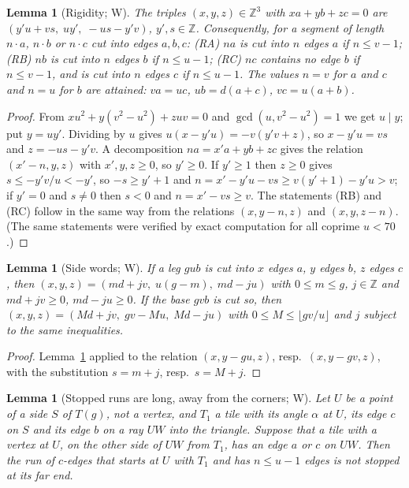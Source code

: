 \documentclass[11pt,reqno]{amsart}
\theoremstyle{plain}
\newtheorem{lemma}[theorem]{Lemma}
\theoremstyle{definition}
\newcommand{\Z}{\mathbb{Z}}
\newcommand{\sW}{\textup{\textsf{W}}}
\begin{document}
\begin{lemma}[Rigidity; \sW]\label{lem:rigid}
The triples $(x,y,z)\in\Z^3$ with $xa+yb+zc=0$ are $(y'u+vs,\;uy',\;-us-y'v)$, $y',s\in\Z$. Consequently, for a segment of
length $n\cdot a$, $n\cdot b$ or $n\cdot c$ cut into edges $a,b,c$: \textup{(RA)} $na$ is cut into $n$ edges $a$ if $n\le v-1$;
\textup{(RB)} $nb$ is cut into $n$ edges $b$ if $n\le u-1$; \textup{(RC)} $nc$ contains no edge $b$ if $n\le v-1$, and is cut into
$n$ edges $c$ if $n\le u-1$. The values $n=v$ for $a$ and $c$ and $n=u$ for $b$ are attained: $va=uc$, $ub=d(a+c)$, $vc=u(a+b)$.
\end{lemma}
\begin{proof}
From $xu^2+y(v^2-u^2)+zuv=0$ and $\gcd(u,v^2-u^2)=1$ we get $u\mid y$; put $y=uy'$. Dividing by $u$ gives
$u(x-y'u)=-v(y'v+z)$, so $x-y'u=vs$ and $z=-us-y'v$. A decomposition $na=x'a+yb+zc$ gives the relation $(x'-n,y,z)$ with $x',y,z\ge0$, so $y'\ge0$. If $y'\ge1$ then $z\ge0$ gives $s\le-y'v/u<-y'$, so $-s\ge y'+1$ and $n=x'-y'u-vs\ge v(y'+1)-y'u>v$; if $y'=0$ and $s\ne0$ then $s<0$ and $n=x'-vs\ge v$.
The statements (RB) and (RC) follow in the same way from the relations $(x,y-n,z)$ and $(x,y,z-n)$. (The same
statements were verified by exact computation for all coprime $u<70$.)
\end{proof}

\begin{lemma}[Side words; \sW]\label{lem:words}
If a leg $gub$ is cut into $x$ edges $a$, $y$ edges $b$, $z$ edges $c$, then $(x,y,z)=(md+jv,\;u(g-m),\;md-ju)$ with
$0\le m\le g$, $j\in\Z$ and $md+jv\ge0$, $md-ju\ge0$. If the base $gvb$ is cut so, then $(x,y,z)=(Md+jv,\;gv-Mu,\;Md-ju)$
with $0\le M\le\lfloor gv/u\rfloor$ and $j$ subject to the same inequalities.
\end{lemma}
\begin{proof}
Lemma~\ref{lem:rigid} applied to the relation $(x,y-gu,z)$, resp.\ $(x,y-gv,z)$, with the substitution $s=m+j$, resp.\ $s=M+j$.
\end{proof}

\begin{lemma}[Stopped runs are long, away from the corners; \sW]\label{lem:33}
Let $U$ be a point of a side $S$ of $T(g)$, not a vertex, and $T_1$ a tile with its angle $\alpha$ at $U$, its edge $c$ on $S$ and
its edge $b$ on a ray $UW$ into the triangle. Suppose that a tile with a vertex at $U$, on the other side of $UW$ from $T_1$, has
an edge $a$ or $c$ on $UW$. Then the run of $c$-edges that starts at $U$ with $T_1$ and has $n\le u-1$ edges is not stopped at its far end.
\end{lemma}
\end{document}
